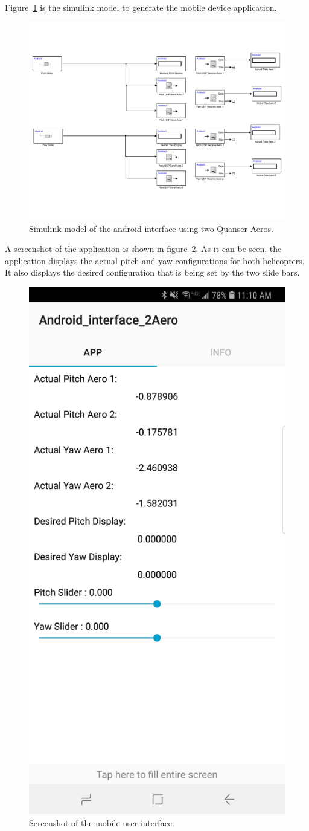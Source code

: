 Figure~\ref{fig:Android_Interface} is the simulink model to generate the mobile device application.
\begin{figure}[!htbp]
    \centering
    \includegraphics[width=.46\textwidth,keepaspectratio=true]{figs/img/Android_Interface_2Aero}
    \caption{Simulink model of the android interface using two Quanser Aeros.}
    \label{fig:Android_Interface}
\end{figure}
A screenshot of the application is shown in figure~\ref{fig:Screenshot_Android_Interface}.  As it can be seen, the application displays the actual pitch and yaw configurations for both helicopters.  It also displays the desired configuration that is being set by the two slide bars.
\begin{figure}[!htbp]
    \centering
    \includegraphics[width=.46\textwidth,keepaspectratio=true]{figs/img/Screenshot_Android_Interface_2Aero}
    \caption{Screenshot of the mobile user interface.}
    \label{fig:Screenshot_Android_Interface}
\end{figure}

